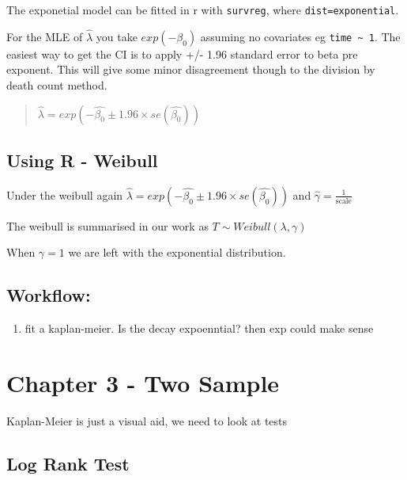 \documentclass[
  letterpaper,
  DIV=11,
  numbers=noendperiod]{scrreprt}
\providecommand{\tightlist}{%
  \setlength{\itemsep}{0pt}\setlength{\parskip}{0pt}}\usepackage{longtable,booktabs,array}
\begin{document}
The exponetial model can be fitted in r with \texttt{survreg}, where
\texttt{dist=\textquotesingle{}exponential\textquotesingle{}}.

For the MLE of \(\hat{\lambda}\) you take \(exp(-\beta_0)\) assuming no
covariates eg \texttt{time\ \textasciitilde{}\ 1}. The easiest way to
get the CI is to apply +/- 1.96 standard error to beta pre exponent.
This will give some minor disagreement though to the division by death
count method.

\begin{quote}
\(\hat{\lambda} = exp(-\hat{\beta_0} \pm 1.96\times se(\hat{\beta_0}))\)
\end{quote}

\hypertarget{using-r---weibull}{%
\subsection{Using R - Weibull}\label{using-r---weibull}}

Under the weibull again
\(\hat{\lambda} = exp(-\hat{\beta_0} \pm 1.96\times se(\hat{\beta_0}))\)
and \(\hat{\gamma} = \frac{1}{\text{scale}}\)

The weibull is summarised in our work as
\(T \sim Weibull(\lambda, \gamma)\)

When \(\gamma = 1\) we are left with the exponential distribution.

\hypertarget{workflow-1}{%
\subsection{Workflow:}\label{workflow-1}}

\begin{enumerate}
\def\labelenumi{\arabic{enumi}.}
\tightlist
\item
  fit a kaplan-meier. Is the decay expoenntial? then exp could make
  sense
\end{enumerate}

\hypertarget{chapter-3---two-sample}{%
\section{Chapter 3 - Two Sample}\label{chapter-3---two-sample}}

Kaplan-Meier is just a visual aid, we need to look at tests

\hypertarget{log-rank-test}{%
\subsection{Log Rank Test}\label{log-rank-test}}
\end{document}
